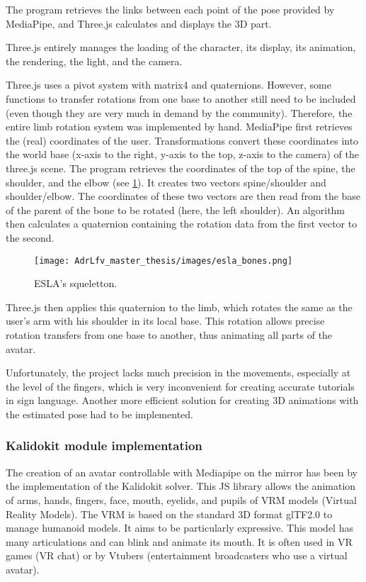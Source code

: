 The program retrieves the links between each point of the pose provided by MediaPipe, and Three.js calculates and displays the 3D part. 

Three.js entirely manages the loading of the character, its display, its animation, the rendering, the light, and the camera.

Three.js uses a pivot system with matrix4 and quaternions. However, some functions to transfer rotations from one base to
another still need to be included (even though they are very much in demand by the community). Therefore, the entire limb rotation system was implemented by hand.
MediaPipe first retrieves the (real) coordinates of the user. Transformations convert these coordinates into the world base (x-axis to the right, y-axis to the top, z-axis to the camera) of the three.js scene. The program retrieves the coordinates of the top of the spine, the shoulder, and the elbow (see \ref{fig:esla_bones}). It creates two vectors spine/shoulder and shoulder/elbow. The coordinates of these two vectors are then read from the base of the parent of the bone to be rotated (here, the left shoulder). An algorithm then calculates a quaternion containing the rotation data from the first vector to the second.

\begin{figure}[h]
    \centering
    \texttt{[image: AdrLfv\_master\_thesis/images/esla\_bones.png]}
    \caption{ESLA's squeletton.}
    \label{fig:esla_bones}
\end{figure}

Three.js then applies this quaternion to the limb, which rotates the same as the user's arm with his shoulder in its local base.
This rotation allows precise rotation transfers from one base to another, thus animating all parts of the avatar.

Unfortunately, the project lacks much precision in the movements, especially at the level of the fingers, which is very inconvenient for creating accurate tutorials in sign language. Another more efficient solution for creating 3D animations with the estimated pose had to be implemented.

\subsubsection{Kalidokit module implementation}

The creation of an avatar controllable with Mediapipe on the mirror has been by the implementation of the Kalidokit solver. This JS library allows the animation of arms, hands, fingers, face, mouth, eyelids, and pupils of VRM models (Virtual Reality Models). The VRM is based on the standard 3D format glTF2.0 to manage humanoid models. It aims to be particularly expressive. This model has many articulations and can blink and animate its mouth. It is often used in VR games (VR chat) or by Vtubers (entertainment broadcasters who use a virtual avatar).  

